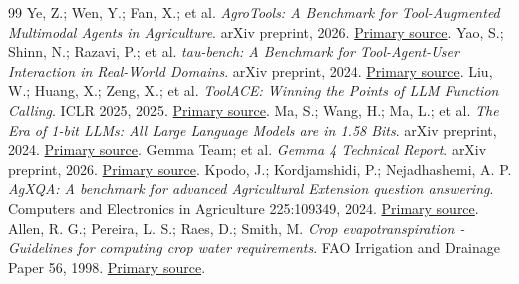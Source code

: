 \documentclass[10pt,a4paper]{article}
\begin{document}
\begin{thebibliography}{99}
Ye, Z.; Wen, Y.; Fan, X.; et al. \emph{AgroTools: A Benchmark for Tool-Augmented Multimodal Agents in Agriculture}. arXiv preprint, 2026. \href{https://arxiv.org/abs/2605.22366}{Primary source}.
Yao, S.; Shinn, N.; Razavi, P.; et al. \emph{tau-bench: A Benchmark for Tool-Agent-User Interaction in Real-World Domains}. arXiv preprint, 2024. \href{https://arxiv.org/abs/2406.12045}{Primary source}.
Liu, W.; Huang, X.; Zeng, X.; et al. \emph{ToolACE: Winning the Points of LLM Function Calling}. ICLR 2025, 2025. \href{https://proceedings.iclr.cc/paper_files/paper/2025/hash/663865ea167425c6c562cb0b6bcf76c7-Abstract-Conference.html}{Primary source}.
Ma, S.; Wang, H.; Ma, L.; et al. \emph{The Era of 1-bit LLMs: All Large Language Models are in 1.58 Bits}. arXiv preprint, 2024. \href{https://arxiv.org/abs/2402.17764}{Primary source}.
Gemma Team; et al. \emph{Gemma 4 Technical Report}. arXiv preprint, 2026. \href{https://arxiv.org/abs/2607.02770}{Primary source}.
Kpodo, J.; Kordjamshidi, P.; Nejadhashemi, A. P. \emph{AgXQA: A benchmark for advanced Agricultural Extension question answering}. Computers and Electronics in Agriculture 225:109349, 2024. \href{https://doi.org/10.1016/j.compag.2024.109349}{Primary source}.
Allen, R. G.; Pereira, L. S.; Raes, D.; Smith, M. \emph{Crop evapotranspiration - Guidelines for computing crop water requirements}. FAO Irrigation and Drainage Paper 56, 1998. \href{https://www.fao.org/4/x0490e/x0490e00.htm}{Primary source}.
\end{thebibliography}
\end{document}

